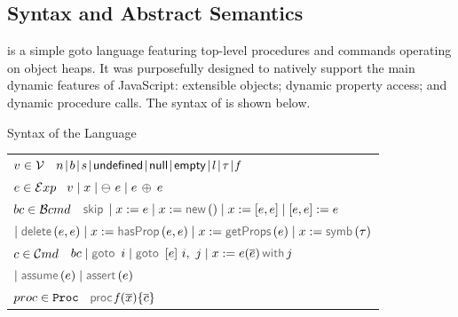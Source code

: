 \vspace*{-0.2cm}
\subsection{\jsil Syntax and Abstract Semantics}\label{subsec:jsil:analysis:formalism}

\vspace*{-0.1cm}
 \jsil is a simple goto language featuring top-level procedures and commands operating on object heaps. It was purposefully designed to natively support the main dynamic features of JavaScript: extensible objects; dynamic property access; and dynamic procedure calls. The syntax of \jsil is shown below. 

\vspace{5pt}
\begin{display}{Syntax of the \jsil Language}{
\begin{tabular}{l}
$v \in \mathcal{V}$ \ $\jnumber \! \mid \! \jbool \! \mid \! \jstring \! \mid \! {\small \jundefined} \! \mid \! {\small \jnull} \! \mid \! {\small \jempty} \! \mid \! \loc \! \mid \! \jtype \! \mid \!  \pid$
   \\[0.1cm]
  $e \in \mathcal{E}xp$ \ $\val \mid \jvar \mid \ominus\ \jsilexpr \mid \jsilexpr \binop{} \jsilexpr$
 \\[0.1cm]
%
$bc \in \mathcal{B}cmd$ \ $\jsilskip \mid \jvar := \jsilexpr  \mid \jvar := \jsilnew() \mid \jvar := [\jsilexpr, \jsilexpr] \mid [\jsilexpr, \jsilexpr] := \jsilexpr $ \\
%
\hspace{0.02cm} $\mid \jsildelete(\jsilexpr, \jsilexpr) \mid \jvar := \hasfield(\jsilexpr, \jsilexpr) \mid \jvar := \getfields(\jsilexpr) \mid \jvar := \makesymbolic(\jtype)$ \\[0.1cm]
$c \in \mathcal{C}md$  \ $ \bcmd \mid \goto \ i \mid  \ifgoto{\jsilexpr}{i}{j} \mid \jsilcall{\jvar}{\jsilexpr}{\jvec{\jsilexpr}}{j}$ \\
\hspace{0.02cm} $ \mid \assume(\jsilexpr) \mid \jassert(\jsilexpr)$ \\[0.1cm]
%
$proc \in \mathtt{Proc}$  \ $\procedure{\pid}{\jvec{\jvar}}{\jvec{\jcmd}}$
 \end{tabular}}
\end{display}

